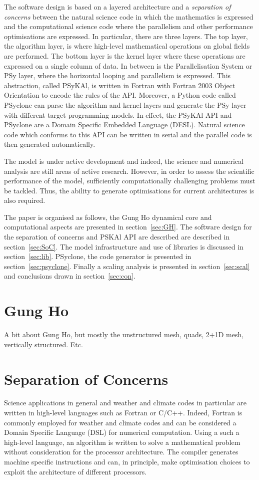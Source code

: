 \documentclass[times]{elsarticle}
\begin{document}
The software design is based on a layered architecture and a 
{\em separation of concerns} between the natural science code in which
the mathematics is expressed and the computational science code where the
parallelism and other performance optimisations are expressed. In particular,
there are three layers. The top layer, the algorithm layer, is where high-level mathematical 
operations on global fields are performed. The bottom layer is the kernel layer
where these operations are expressed on a single column of data. In between is the
Parallelisation System or PSy layer, where the horizontal looping and parallelism is
expressed. This abstraction, called PSyKAl, is written in Fortran with Fortran 2003
Object Orientation to encode the rules of the API.
Moreover, a Python code called PSyclone can parse the algorithm and kernel layers and
generate the PSy layer with different target programming models. In effect, the PSyKAl API
and PSyclone are a Domain Specific Embedded Language (DESL). Natural science code which
conforms to this API can be written in serial and the parallel code is then generated automatically.

The model is under active development and indeed, the science and
numerical analysis are still areas of active research. However, in
order to assess the scientific performance of the model, sufficiently
computationally challenging problems must be tackled. Thus, the
ability to generate optimisations for current architectures is also
required. 

The paper is organised as follows, the Gung Ho dynamical core and
computational aspects are presented in section~\ref{sec:GH}. The
software design for the separation of concerns and PSKAl API are described 
are described in section~\ref{sec:SoC}. The model infrastructure and
use of libraries is discussed in section~\ref{sec:lib}. PSyclone, the
code generator is presented in section~\ref{sec:psyclone}. Finally a
scaling analysis is presented in section~\ref{sec:scal} and
conclusions drawn in section~\ref{sec:con}.

\section{\label{sec:GH}Gung Ho}
A bit about Gung Ho, but mostly the unstructured mesh, quads, 2+1D
mesh, vertically structured. Etc.

\section{\label{sec:SoC}Separation of Concerns}
Science applications in general and weather and climate codes in
particular are written in high-level languages such as Fortran or
C/C++. Indeed, Fortran is commonly employed for weather and climate
codes and can be considered a Domain Specific Language (DSL) for
numerical computation. Using a such a high-level language, an
algorithm is written to solve a mathematical problem without
consideration for the processor architecture. The compiler generates
machine specific instructions and can, in principle, make optimisation
choices to exploit the architecture of different processors.
\end{document}
